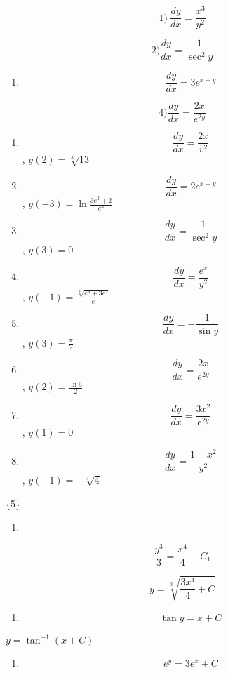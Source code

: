 \documentclass[
]{article}
\providecommand{\tightlist}{%
  \setlength{\itemsep}{0pt}\setlength{\parskip}{0pt}}
\begin{document}
\[1) \ \frac{dy}{dx} = \frac{x^3}{y^2}\]

\[2) \frac{dy}{dx} = \frac{1}{\sec^2 y}\]

\begin{enumerate}
\def\labelenumi{\arabic{enumi})}
\setcounter{enumi}{2}
\tightlist
\item
  \[\frac{dy}{dx} = 3e^{x-y}\]
\end{enumerate}

\[4) \frac{dy}{dx} = \frac{2x}{e^{2y}}\]

\begin{enumerate}
\def\labelenumi{\arabic{enumi})}
\setcounter{enumi}{4}
\item
  \[\frac{dy}{dx} = \frac{2x}{v^2}\] , \(y(2) = \sqrt[3]{13}\)
\item
  \[\frac{dy}{dx} = 2e^{x-y}\] , \(y(-3) = \ln \frac{3e^3 + 2}{e^3}\)
\item
  \[\frac{dy}{dx} = \frac{1}{\sec^2 y}\] , \(y(3) = 0\)
\item
  \[\frac{dy}{dx} = \frac{e^x}{y^2}\] ,
  \(y(-1) = \frac{\sqrt[3]{e^3 + 3e^2}}{e}\)
\item
  \[\frac{dy}{dx} = -\frac{1}{\sin y}\] , \(y(3) = \frac{\pi}{2}\)
\item
  \[\frac{dy}{dx} = \frac{2x}{e^{2y}}\] , \(y(2) = \frac{\ln 5}{2}\)
\item
  \[\frac{dy}{dx} = \frac{3x^2}{e^{2y}}\] , \(y(1) = 0\)
\item
  \[\frac{dy}{dx} = \frac{1+x^2}{y^2}\] , \(y(-1) = -\sqrt[3]{4}\)
\end{enumerate}

\{5\}------------------------------------------------

\begin{enumerate}
\def\labelenumi{\arabic{enumi})}
\tightlist
\item
\end{enumerate}

\[\frac{y^3}{3} = \frac{x^4}{4} + C_1\]

\[y = \sqrt[3]{\frac{3x^4}{4} + C}\]

\begin{enumerate}
\def\labelenumi{\arabic{enumi})}
\setcounter{enumi}{1}
\tightlist
\item
  \[\tan y = x + C\]
\end{enumerate}

\(y = \tan^{-1} (x + C)\)

\begin{enumerate}
\def\labelenumi{\arabic{enumi})}
\setcounter{enumi}{2}
\tightlist
\item
  \[e^y = 3e^x + C\]
\end{enumerate}
\end{document}
